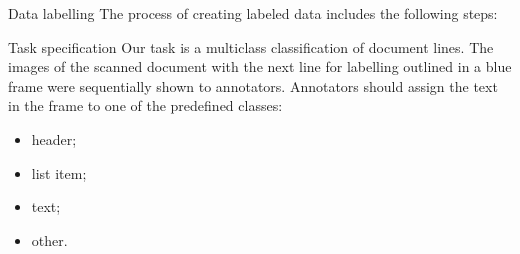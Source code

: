 \documentclass{beamer}
\begin{document}
\begin{frame}{Data labelling}
    The process of creating labeled data includes the following steps:
\end{frame}

\begin{frame}{Task specification}
    Our task is a multiclass classification of document lines. The images of the scanned document with the next line for labelling outlined in a blue frame were sequentially shown to annotators. Annotators should assign the text in the frame to one of the predefined classes: 
    \begin{itemize}
        \item header;
        \item list item;
        \item text;
        \item other.
    \end{itemize}
\end{frame}
\end{document}
